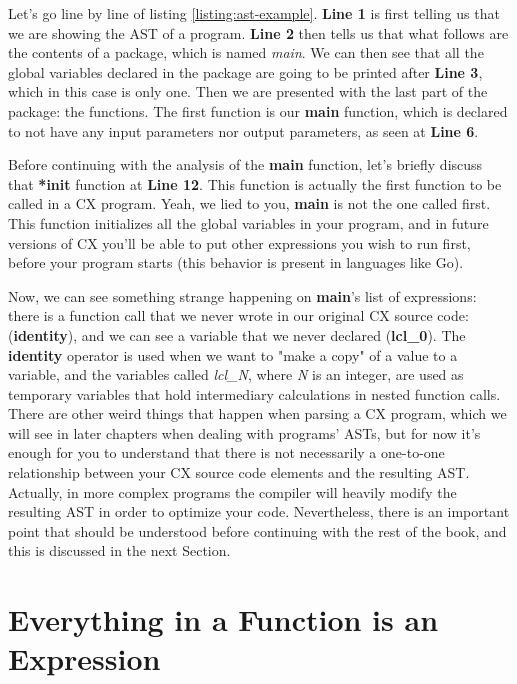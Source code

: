 \documentclass[11pt,fleqn,openany]{book} %
\begin{document}
Let's go line by line of listing \ref{listing:ast-example}. \textbf{Line 1} is first telling us that we are showing the AST of a program. \textbf{Line 2} then tells us that what follows are the contents of a package, which is named \textit{main}. We can then see that all the global variables declared in the package are going to be printed after \textbf{Line 3}, which in this case is only one. Then we are presented with the last part of the package: the functions. The first function is our \textbf{main} function, which is declared to not have any input parameters nor output parameters, as seen at \textbf{Line 6}.

Before continuing with the analysis of the \textbf{main} function, let's briefly discuss that \textbf{*init} function at \textbf{Line 12}. This function is actually the first function to be called in a CX program. Yeah, we lied to you, \textbf{main} is not the one called first. This function initializes all the global variables in your program, and in future versions of CX you'll be able to put other expressions you wish to run first, before your program starts (this behavior is present in languages like Go).

Now, we can see something strange happening on \textbf{main}'s list of expressions: there is a function call that we never wrote in our original CX source code: (\textbf{identity}), and we can see a variable that we never declared (\textbf{lcl\_0}). The \textbf{identity} operator is used when we want to "make a copy" of a value to a variable, and the variables called \textit{lcl\_N}, where \textit{N} is an integer, are used as temporary variables that hold intermediary calculations in nested function calls. There are other weird things that happen when parsing a CX program, which we will see in later chapters when dealing with programs' ASTs, but for now it's enough for you to understand that there is not necessarily a one-to-one relationship between your CX source code elements and the resulting AST. Actually, in more complex programs the compiler will heavily modify the resulting AST in order to optimize your code. Nevertheless, there is an important point that should be understood before continuing with the rest of the book, and this is discussed in the next Section.

\section{Everything in a Function is an Expression}
\end{document}

